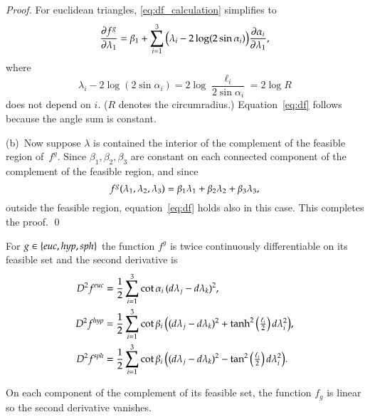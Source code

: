 \documentclass[Thesis]{subfiles}
\begin{document}
\begin{proof}
  For euclidean triangles, \eqref{eq:df_calculation} simplifies to
  \begin{equation*}
    \frac{\partial f^{g}}{\partial\lambda_{1}}
    =
    \beta_{1} + \sum_{i=1}^{3}
    \big(\lambda_{i} - 2\log(2\sin\alpha_{i})\big)
    \frac{\partial\alpha_{i}}{\partial\lambda_{1}},
  \end{equation*}  
  where
  \begin{equation*}
    \lambda_{i}-2\log(2\sin\alpha_{i})=2\log\frac{\ell_{i}}{2\sin\alpha_{i}}
    =2\log R
  \end{equation*}
  does not depend on $i$. ($R$ denotes the circumradius.)
  Equation~\eqref{eq:df} follows because the angle sum is constant.

  (b)\, Now suppose $\lambda$ is contained the interior of the complement of
  the feasible region of~$f^{g}$. Since
  $\beta_{1},\beta_{2},\beta_{3}$ are constant on each connected
  component of the complement of the feasible region, and since
  \begin{equation*}
    f^{g}(\lambda_{1}, \lambda_{2}, \lambda_{3}) 
    = \beta_{1} \lambda_{1} 
    + \beta_{2} \lambda_{2} 
    + \beta_{3} \lambda_{3},
  \end{equation*}
  outside the feasible region, equation~\ref{eq:df} holds also in
  this case. This completes the proof.
  \qed
\end{proof}

\begin{proposition}
  \label{prop:ddf}
  For $\g\in\{\euc,\hyp,\sph\}$ the function $f^{g}$ is twice
  continuously differentiable on its feasible set and
  the second derivative is 
  \begin{align}
    \label{eq:ddf_euc}
    D^{2}f^{\euc} &= 
    \frac{1}{2}\sum_{i=1}^{3} \cot\alpha_{i}\,
    (d\lambda_{j}-d\lambda_{k})^{2},\\
    \label{eq:ddf_hyp}
    D^{2}f^{\hyp} &=
    \frac{1}{2}\sum_{i=1}^{3} \cot\beta_{i}\,
    \big(
    (d\lambda_{j}-d\lambda_{k})^{2}
    +\tanh^{2}\big(
    \tfrac{\ell_{i}}{2}
    \big)\,
    d\lambda_{i}^{2}
    \big),\\
    \label{eq:ddf_sph}
    D^{2}f^{\sph} &=
    \frac{1}{2}\sum_{i=1}^{3} \cot\beta_{i}\,
    \big(
    (d\lambda_{j}-d\lambda_{k})^{2}
    -\tan^{2}\big(
    \tfrac{\ell_{i}}{2}
    \big)\,
    d\lambda_{i}^{2}
    \big).
  \end{align}
  
  On each component of the complement of its feasible set, the
  function $f_{g}$ is linear so the second derivative vanishes.
\end{proposition}
\end{document}
